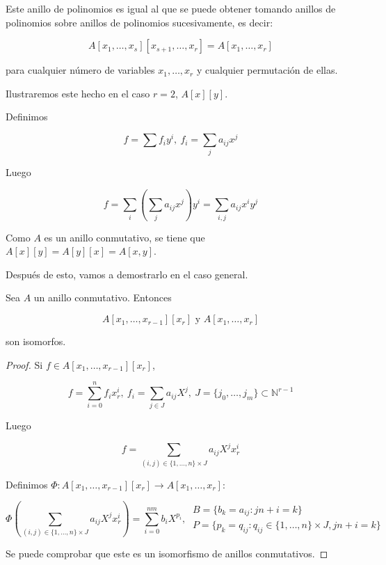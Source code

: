 Este anillo de polinomios es igual al que se puede obtener tomando anillos de polinomios sobre anillos de polinomios sucesivamente,
es decir:

\[
    A[x_1, \dots, x_{s}][x_{s+1}, \dots, x_{r}] = A[x_1, \dots, x_r]
\]

para cualquier número de variables $x_1, \dots, x_r$ y cualquier permutación de ellas.

Ilustraremos este hecho en el caso $r=2$, $A[x][y]$.

Definimos

\[
f=\sum f_i y^i,\ f_i = \sum_j a_{ij}x^j
\]

Luego

\[
f = \sum_i \left(\sum_j a_{ij}x^j \right)y^i = \sum_{i,j} a_{ij}x^iy^j
\]

Como $A$ es un anillo conmutativo, se tiene que $A[x][y] = A[y][x] = A[x,y]$.

Después de esto, vamos a demostrarlo en el caso general.

\begin{nprop}
  Sea $A$ un anillo conmutativo. Entonces

  \[
     A[x_1, \dots, x_{r-1}][x_r] \text{ y } A[x_1, \dots, x_r]
  \]

   son isomorfos.
\end{nprop}

\begin{proof}
  Si $f \in A[x_1, \dots, x_{r-1}][x_r]$,

  \[
       f = \sum_{i=0}^n f_i x_r^i,\ f_i = \sum_{j\in J} a_{ij} X^j,\ J = \{j_0, \dots, j_m\} \subset \mathbb{N}^{r-1}
  \]

  Luego

  \[
      f = \sum_{(i,j) \in \{1,\dots,n\}\times J} a_{ij}X^j x_r^i
  \]

  Definimos $\Phi : A[x_1, \dots, x_{r-1}][x_r] \to A[x_1, \dots, x_r]$:

  \[
    \Phi \left(\sum_{(i,j) \in \{1,\dots,n\}\times J} a_{ij}X^j x_r^i\right) = \sum_{i=0}^{nm} b_i X^{p_i},\
    \begin{array}{l}
      B = \{ b_k = a_{ij} : jn + i = k \} \\
      P = \{ p_k = q_{ij} : q_{ij} \in \{1, \dots, n \} \times J, jn+i = k \}
    \end{array}
  \]

  Se puede comprobar que este es un isomorfismo de anillos conmutativos.

\end{proof}



